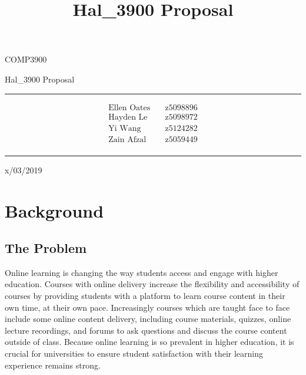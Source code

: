 \documentclass{article}
\title{Hal\_3900 Proposal}
\begin{document}
\begin{LARGE}
\begin{center}
\vspace*{15mm}

COMP3900

Hal\_3900 Proposal

\rule[4.5pt]{0.61\textwidth}{0.3pt}

\begin{align*}
  \text{Ellen Oates}    \quad   &\text{z5098896} \\
  \text{Hayden Le}      \quad   &\text{z5098972} \\
  \text{Yi Wang}        \quad   &\text{z5124282} \\
  \text{Zain Afzal}     \quad   &\text{z5059449} \\
\end{align*}

\rule[4.5pt]{0.61\textwidth}{0.3pt}

x/03/2019

\end{center}
\end{LARGE}
\newpage


\tableofcontents 
\newpage
 
\section{Background}

\subsection{The Problem}

Online learning is changing the way students access and engage with higher education. Courses with online delivery increase the flexibility and accessibility of courses by providing students with a platform to learn course content in their own time, at their own pace. Increasingly courses which are taught face to face include some online content delivery, including course materials, quizzes, online lecture recordings, and forums to ask questions and discuss the course content outside of class. Because online learning is so prevalent in higher education, it is crucial for universities to ensure student satisfaction with their learning experience remains strong. 
\end{document}
